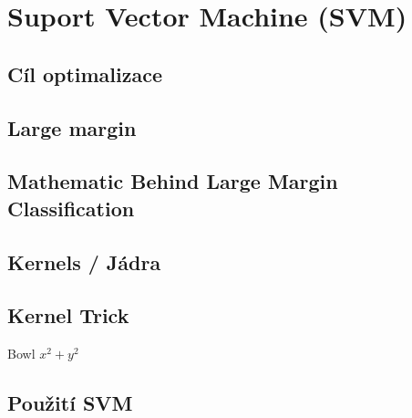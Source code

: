 
\chapter{Suport Vector Machine (SVM)}
\label{sec:SVM}

\section{Cíl optimalizace}

\section{Large margin}

\section{Mathematic Behind Large Margin Classification}

\section{Kernels / Jádra}

\section{Kernel Trick}
Bowl $x^2 + y^2$

\section{Použití SVM}